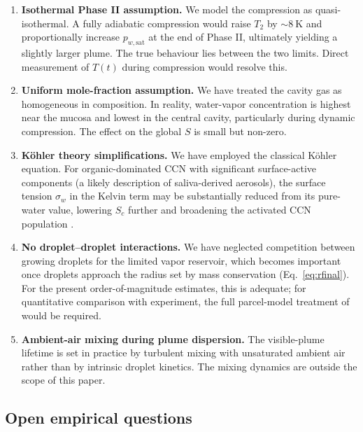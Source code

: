\documentclass[11pt,a4paper]{article}
\newcommand{\pwsat}{p_{w,\text{sat}}}
\theoremstyle{definition}
\theoremstyle{plain}
\begin{document}
\begin{enumerate}
  \item \textbf{Isothermal Phase II assumption.} We model the compression as quasi-isothermal. A fully adiabatic compression would raise $T_2$ by $\sim\!\SI{8}{\kelvin}$ and proportionally increase $\pwsat$ at the end of Phase II, ultimately yielding a slightly larger plume. The true behaviour lies between the two limits. Direct measurement of $T(t)$ during compression would resolve this.
  \item \textbf{Uniform mole-fraction assumption.} We have treated the cavity gas as homogeneous in composition. In reality, water-vapor concentration is highest near the mucosa and lowest in the central cavity, particularly during dynamic compression. The effect on the global $S$ is small but non-zero.
  \item \textbf{Köhler theory simplifications.} We have employed the classical Köhler equation. For organic-dominated CCN with significant surface-active components (a likely description of saliva-derived aerosols), the surface tension $\sigma_w$ in the Kelvin term may be substantially reduced from its pure-water value, lowering $S_c$ further and broadening the activated CCN population \citep{Facchini1999,Sorjamaa2004}.
  \item \textbf{No droplet–droplet interactions.} We have neglected competition between growing droplets for the limited vapor reservoir, which becomes important once droplets approach the radius set by mass conservation (Eq.~\ref{eq:rfinal}). For the present order-of-magnitude estimates, this is adequate; for quantitative comparison with experiment, the full parcel-model treatment of \citet{Pinsky2013} would be required.
  \item \textbf{Ambient-air mixing during plume dispersion.} The visible-plume lifetime is set in practice by turbulent mixing with unsaturated ambient air rather than by intrinsic droplet kinetics. The mixing dynamics are outside the scope of this paper.
\end{enumerate}

\subsection{Open empirical questions}
\end{document}
